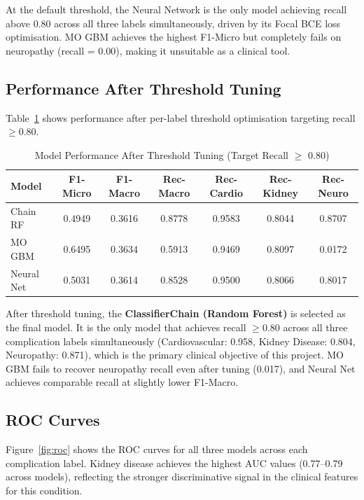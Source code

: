 \documentclass[12pt]{article}
\begin{document}
At the default threshold, the Neural Network is the only model achieving recall above
0.80 across all three labels simultaneously, driven by its Focal BCE loss optimisation.
MO GBM achieves the highest F1-Micro but completely fails on neuropathy (recall = 0.00),
making it unsuitable as a clinical tool.

\subsection{Performance After Threshold Tuning}

Table~\ref{tab:tuned} shows performance after per-label threshold optimisation targeting
recall $\geq 0.80$.

\begin{table}[H]
  \centering
  \caption{Model Performance After Threshold Tuning (Target Recall $\geq$ 0.80)}
  \label{tab:tuned}
  \begin{tabular}{lcccccc}
    \toprule
    Model & F1-Micro & F1-Macro & Rec-Macro & Rec-Cardio & Rec-Kidney & Rec-Neuro \\
    \midrule
    Chain RF   & 0.4949 & 0.3616 & 0.8778 & 0.9583 & 0.8044 & 0.8707 \\
    MO GBM     & 0.6495 & 0.3634 & 0.5913 & 0.9469 & 0.8097 & 0.0172 \\
    Neural Net & 0.5031 & 0.3614 & 0.8528 & 0.9500 & 0.8066 & 0.8017 \\
    \bottomrule
  \end{tabular}
\end{table}

After threshold tuning, the \textbf{ClassifierChain (Random Forest)} is selected as the
final model. It is the only model that achieves recall $\geq 0.80$ across all three
complication labels simultaneously (Cardiovascular: 0.958, Kidney Disease: 0.804,
Neuropathy: 0.871), which is the primary clinical objective of this project. MO GBM
fails to recover neuropathy recall even after tuning (0.017), and Neural Net achieves
comparable recall at slightly lower F1-Macro.

\subsection{ROC Curves}

Figure~\ref{fig:roc} shows the ROC curves for all three models across each complication
label. Kidney disease achieves the highest AUC values (0.77--0.79 across models),
reflecting the stronger discriminative signal in the clinical features for this
condition.
\end{document}
